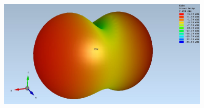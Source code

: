 \begin{figure}[h]
\begin{center}
\begin{minipage}[t]{\textwidth}
\begin{center}
				\label{fig:sim_Loop_3Fach_1ABS_3D}
			\end{center}
		\end{minipage}
		\begin{minipage}[t]{\textwidth}
			\begin{center}
				\includegraphics[width=0.9\textwidth]{content/bilder/Evaluation/Loop/Kurz3/EMFraField_Loop_2ABS_kurz3.JPG}
				\label{fig:sim_Loop_3Fach_2ABS_3D}
			\end{center}
		\end{minipage}
	\end{center}
\end{figure}





